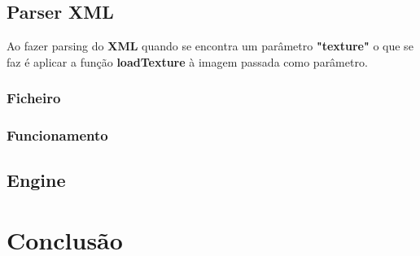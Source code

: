 \documentclass[a4paper]{article}
\begin{document}
\subsection{Parser XML}
\label{sec:parsert}

Ao fazer parsing do \textbf{XML} quando se encontra um parâmetro \textbf{"texture"}  o que se faz é aplicar a função \textbf{loadTexture} à imagem passada como parâmetro.


\subsubsection{Ficheiro}
\label{sec:ficheirot}

\subsubsection{Funcionamento}
\label{sec:funcionamentot}

\subsection{Engine}
\label{sec:enginet}


\section{Conclusão}
\label{sec:conclusao}
\end{document}
